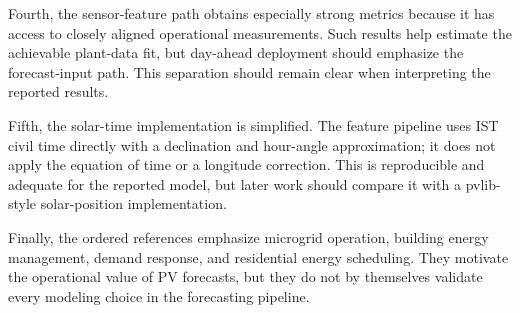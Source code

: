 Fourth, the sensor-feature path obtains especially strong metrics because it has access to closely aligned operational measurements. Such results help estimate the achievable plant-data fit, but day-ahead deployment should emphasize the forecast-input path. This separation should remain clear when interpreting the reported results.

Fifth, the solar-time implementation is simplified. The feature pipeline uses IST civil time directly with a declination and hour-angle approximation; it does not apply the equation of time or a longitude correction. This is reproducible and adequate for the reported model, but later work should compare it with a pvlib-style solar-position implementation.

Finally, the ordered references emphasize microgrid operation, building energy management, demand response, and residential energy scheduling. They motivate the operational value of PV forecasts, but they do not by themselves validate every modeling choice in the forecasting pipeline.
